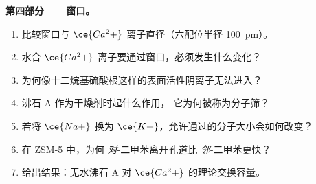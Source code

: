 \begin{problem}
\medskip\noindent\textbf{第四部分——窗口。}
\begin{enumerate}[resume]
  \item 比较窗口与 $\ce{Ca^2+}$ 离子直径（六配位半径
        \qty{100}{pm}）。
  \item 水合 $\ce{Ca^2+}$ 离子要通过窗口，必须发生什么变化？
  \item 为何像十二烷基硫酸根这样的表面活性阴离子无法进入？
  \item 沸石 A 作为干燥剂时起什么作用，
        它为何被称为分子筛？
  \item 若将 $\ce{Na+}$ 换为 $\ce{K+}$，允许通过的分子大小会如何改变？
  \item 在 ZSM-5 中，为何 \textit{对}-二甲苯离开孔道比 \textit{邻}-二甲苯更快？
  \item 给出结果：无水沸石 A 对
        $\ce{Ca^2+}$ 的理论交换容量。
\end{enumerate}
\end{problem}
